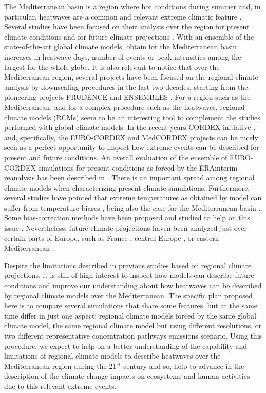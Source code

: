 The Mediterranean basin is a region where hot conditions during summer and, in particular, heatwaves  are a common and relevant extreme climatic feature \cite{lio_al2006, sch_al2004, ste_al2012}. Several studies have been focused
on their analysis over the region for present climate conditions and for future climate projections 
\cite{del_al2007,fis_al2007,gio_lio2008,fis_sch2010,bar_al2011,vau_al2013, chr_al2015,rus_al2015,don_al2016,don_al2017,san_al2018}. With an ensemble of the state-of-the-art global climate models,
\cite{per_gib2017} obtain for the Mediterranean basin increases in heatwave days, number
of events or peak intensities among the largest for the whole globe.
It is also relevant to notice that over the Mediterranean region, several projects
have been focused on the regional climate analysis by downscaling procedures in
the last two decades, starting from the pioneering projects PRUDENCE \cite{san_al2004, jac_al2007}
and ENSEMBLES \cite{van_mit2009}. For a region such as the Mediterranean,
and for a complex procedure such as the heatwaves, regional climate models (RCMs)
seem to be an interesting tool to complement the studies performed with
global climate models. In the recent years CORDEX initiative \cite{gio_gut2015},
and, specifically, the EURO-CORDEX \cite{jac_al2014,kot_al2014} and MedCORDEX \cite{rut_al2016}
projects can be nicely seen as a perfect opportunity to inspect how extreme
events can be described for present and future conditions. An overall
evaluation of the ensemble of EURO-CORDEX simulations for present conditions
as forced by the ERAinterim reanalysis \cite{dee_al2011} has been described in \cite{vau_al2013}.
There is an important spread among regional climate models when characterizing present climate simulations. Furthermore, several studies have pointed that extreme
temperatures as obtained by model can suffer from temperature biases \cite{chr_bob2012},
being also the case for the Mediterranean basin \cite{bob_al2012}.
Some bias-correction methods have been proposed and studied to help on this 
issue \cite{dos2016,dos_fis2018}. Nevertheless, future climate projections
haven been analyzed just over certain parts of Europe, such as France \cite{ouz_al2016},
central Europe \cite{lho_al2018}, or eastern Mediterranean \cite{zit_al2016}.

Despite the limitations described in previous studies based on regional climate projections, 
it is still of  high interest to inspect how models can describe future 
conditions and 
improve our understanding about how heatwaves can be described by regional climate models over the Mediterranean. The specific plan proposed
here is to compare several simulations that share some features, but at
the same time differ in just one aspect: regional climate models
forced by the same global climate model, the same regional climate model
but using different resolutions, or two different representative concentration pathways emissions
scenario. Using this procedure, we expect
to help on a better understanding of the capability and limitations
of regional climate models to describe heatwaves over the Mediterranean
region during the 21$^{st}$ century and so, help to
advance in the description of the climate change impacts on ecosystems and human
activities due to this relevant extreme events.

